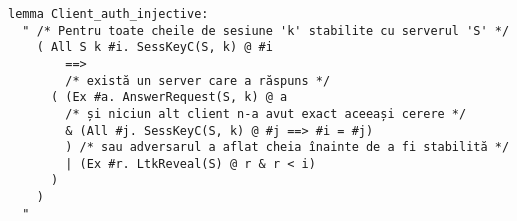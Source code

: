 \documentclass[xcolor=dvipsnames]{beamer}
\newcommand{\fr}[1]{\frame{#1}}
\newcommand{\ft}[1]{\frametitle{\color{bleumarin}{\hfill #1 \hfill}}}
\begin{document}
\begin{frame}[fragile]
  \ft{Proprietate suplimentară: autorizare injectivă}

  {\footnotesize
\begin{verbatim}
lemma Client_auth_injective:
  " /* Pentru toate cheile de sesiune 'k' stabilite cu serverul 'S' */
    ( All S k #i. SessKeyC(S, k) @ #i
        ==>
        /* există un server care a răspuns */
      ( (Ex #a. AnswerRequest(S, k) @ a
        /* și niciun alt client n-a avut exact aceeași cerere */
        & (All #j. SessKeyC(S, k) @ #j ==> #i = #j)
        ) /* sau adversarul a aflat cheia înainte de a fi stabilită */
        | (Ex #r. LtkReveal(S) @ r & r < i)
      )
    )
  "
\end{verbatim}
  }
\end{frame}


\fr{
  \ft{Bibliografie}
  
  
  \nocite{*}
}
\end{document}
